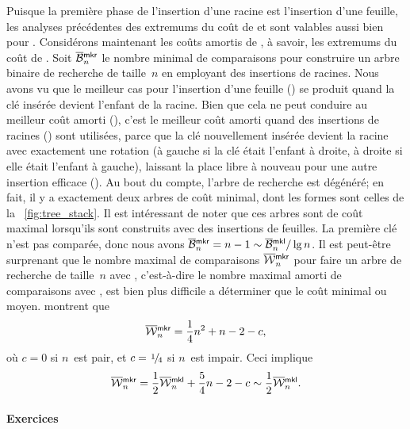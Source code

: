 Puisque la première phase de l'insertion d'une racine est l'insertion
d'une feuille, les analyses précédentes des extremums du coût de
 et  sont valables aussi bien pour
. Considérons maintenant les coûts amortis de
, à savoir, les extremums du coût de .  Soit
\(\OB{\fun{mkr}}{n}\) le nombre minimal
de comparaisons pour construire un arbre binaire de recherche de
taille~\(n\) en employant des insertions de racines. Nous avons vu que
le meilleur cas pour l'insertion d'une feuille () se
produit quand la clé insérée devient l'enfant de la racine. Bien que
cela ne peut conduire au meilleur coût amorti (), c'est le
meilleur coût amorti quand des insertions de racines ()
sont utilisées, parce que la clé nouvellement insérée devient la
racine avec exactement une rotation (à gauche si la clé était l'enfant
à droite, à droite si elle était l'enfant à gauche), laissant la place
libre à nouveau pour une autre insertion efficace (). Au
bout du compte, l'arbre de recherche est dégénéré; en fait, il y a
exactement deux arbres de coût minimal, dont les formes sont celles de
la \fig~\vref{fig:tree_stack}. Il est intéressant de noter que ces
arbres sont de coût maximal lorsqu'ils sont construits avec des
insertions de feuilles. La première clé n'est pas comparée, donc nous
avons \(\OB{\fun{mkr}}{n} = n - 1 \sim \OB{\fun{mkl}}{n}/\lg n\). Il
est peut-être surprenant que le nombre maximal de comparaisons
\(\OW{\fun{mkr}}{n}\) pour faire un
arbre de recherche de taille~\(n\) avec , c'est-à-dire le
nombre maximal amorti de comparaisons avec , est bien plus
difficile a déterminer que le coût minimal ou moyen.
\cite{GeldenhuysVanderMerwe_2009} montrent que
\begin{equation*}
\abovedisplayskip=4pt
\belowdisplayskip=4pt
\OW{\fun{mkr}}{n} = \frac{1}{4}n^2 + n - 2 - c,
\end{equation*}
où \(c = 0\) si \(n\)~est pair, et \(c=\myfrac{1}/{4}\) si
\(n\)~est impair. Ceci implique
\begin{equation*}
\abovedisplayskip=4pt
\belowdisplayskip=-8pt
\OW{\fun{mkr}}{n} = \frac{1}{2}\OW{\fun{mkl}}{n} + \frac{5}{4}n - 2 -
c \sim \frac{1}{2}\OW{\fun{mkl}}{n}.
\end{equation*}

\paragraph{Exercices}

